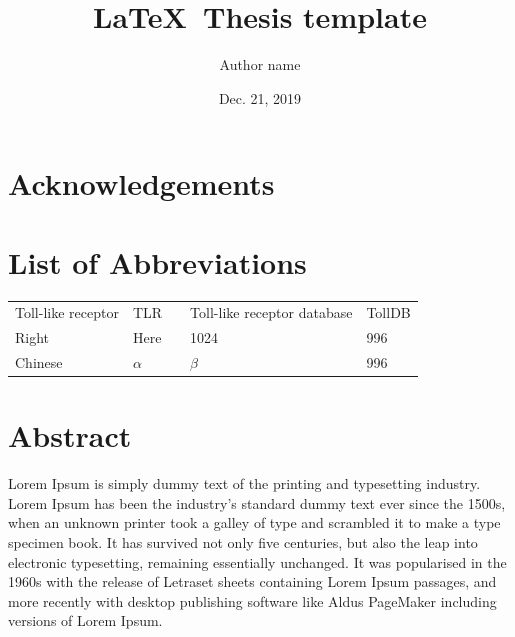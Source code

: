 \documentclass[12pt,openright]{book}
\title{\Huge \bfseries \LaTeX\ Thesis template}
\author{Author name}
\date{Dec. 21, 2019}
\begin{document}

\begin{titlepage}
\maketitle
\end{titlepage}

\pagestyle{empty}
\tableofcontents
\clearpage

\pagestyle{fancy-stylename}

\frontmatter

\chapter*{Acknowledgements}
\lipsum[1-5]

\chapter*{List of Abbreviations}

\begin{tabular}{p{}p{}||p{}p{}p{}}
  Toll-like receptor & TLR & &Toll-like receptor database & TollDB \\
  Right    & Here      & & 1024 & 996 \\
  Chinese  & $\alpha$  & & $\beta$  & 996 \\
\end{tabular}

\newpage

\chapter*{Abstract}

Lorem Ipsum is simply dummy text of the printing and typesetting industry. Lorem Ipsum has been the industry's standard dummy text ever since the 1500s, when an unknown printer took a galley of type and scrambled it to make a type specimen book. It has survived not only five centuries, but also the leap into electronic typesetting, remaining essentially unchanged. It was popularised in the 1960s with the release of Letraset sheets containing Lorem Ipsum passages, and more recently with desktop publishing software like Aldus PageMaker including versions of Lorem Ipsum.~\cite{Weir04}
\end{document}
